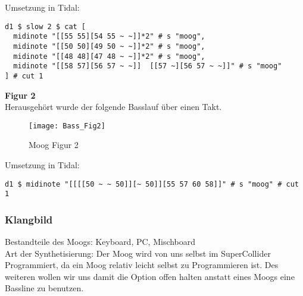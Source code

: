 \documentclass[
10pt, %
a4paper, %
oneside, %
headinclude,footinclude, %
BCOR5mm, %
]{scrartcl}
\begin{document}
\noindent Umsetzung in Tidal:
\begin{lstlisting}
d1 $ slow 2 $ cat [
  midinote "[[55 55][54 55 ~ ~]]*2" # s "moog",
  midinote "[[50 50][49 50 ~ ~]]*2" # s "moog",
  midinote "[[48 48][47 48 ~ ~]]*2" # s "moog",
  midinote "[[58 57][56 57 ~ ~]]  [[57 ~][56 57 ~ ~]]" # s "moog" 
] # cut 1
\end{lstlisting}

\noindent\textbf{Figur 2}\\
Herausgehört wurde der folgende Basslauf über einen Takt.
\begin{figure}[h]
	\centering 
	\texttt{[image: Bass\_Fig2]} 
	\caption{Moog Figur 2}
\end{figure}

\noindent Umsetzung in Tidal:
\begin{lstlisting}
d1 $ midinote "[[[[50 ~ ~ 50]][~ 50]][55 57 60 58]]" # s "moog" # cut 1
\end{lstlisting}

\subsubsection{Klangbild}
Bestandteile des Moogs: Keyboard, PC, Mischboard\\
Art der Synthetisierung: Der Moog wird von uns selbst im SuperCollider Programmiert, da ein Moog relativ leicht selbst zu Programmieren ist.
Des weiteren wollen wir uns damit die Option offen halten anstatt eines Moogs eine Bassline zu benutzen.\\ \\
\end{document}
